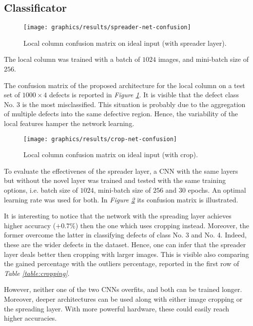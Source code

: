 \subsection{Classificator}\label{section:results:classificator}
\begin{figure}
	\centering
	\texttt{[image: graphics/results/spreader-net-confusion]}
	\caption{Local column confusion matrix on ideal input (with spreader layer).}\label{fig:local-confusion-spreader}
\end{figure}
\par{
	The local column was trained with a batch of $1024$ images, and mini-batch size of $256$.
}
\par{
	The confusion matrix of the proposed architecture for the local column on a test set of $1000\times 4$ defects is reported in \emph{Figure \ref{fig:local-confusion-spreader}}. It is visible that the defect class No. 3 is the most misclassified. This situation is probably due to the aggregation of multiple defects into the same defective region. Hence, the variability of the local features hamper the network learning.
}
\begin{figure}
	\centering
	\texttt{[image: graphics/results/crop-net-confusion]}
	\caption{Local column confusion matrix on ideal input (with crop).}\label{fig:local-confusion-crop}
\end{figure}
\par{
	To evaluate the effectivenes of the spreader layer, a CNN with the same layers but without the novel layer was trained and tested with the same training options, i.e. batch size of $1024$, mini-batch size of $256$ and $30$ epochs. An optimal learning rate was used for both. In \emph{Figure \ref{fig:local-confusion-crop}} its confusion matrix is illustrated.
}
\par{
	It is interesting to notice that the network with the spreading layer achieves higher accuracy ($+0.7\%$) then the one which uses cropping instead. Moreover, the former overcome the latter in classifying defects of class No. 3 and No. 4. Indeed, these are the wider defects in the dataset. Hence, one can infer that the spreader layer deals better then cropping with larger images. This is visible also comparing the gained percentage with the outliers percentage, reported in the first row of \emph{Table \ref{table:cropping}}.
}
\par{
	However, neither one of the two CNNs overfits, and both can be trained longer. Moreover, deeper architectures can be used along with either image cropping or the spreading layer. With more powerful hardware, these could easily reach higher accuracies. 
}
